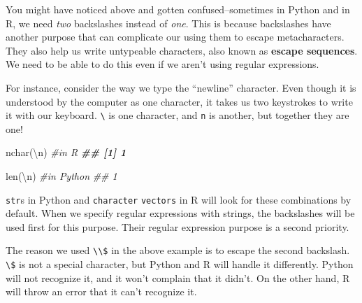 \documentclass[
  12pt,
  krantz2]{krantz}
\makeatletter
\newenvironment{Shaded}{\begin{snugshade}}{\end{snugshade}}
\newcommand{\BuiltInTok}[1]{#1}
\newcommand{\CharTok}[1]{\textcolor[rgb]{0.5,0.5,0.5}{#1}}
\newcommand{\CommentTok}[1]{\textcolor[rgb]{0.37,0.37,0.37}{\textit{#1}}}
\newcommand{\DocumentationTok}[1]{\textcolor[rgb]{0.37,0.37,0.37}{\textbf{\textit{#1}}}}
\newcommand{\FunctionTok}[1]{\textcolor[rgb]{0,0,0}{#1}}
\newcommand{\NormalTok}[1]{#1}
\newcommand{\SpecialCharTok}[1]{\textcolor[rgb]{0,0,0}{#1}}
\newcommand{\StringTok}[1]{\textcolor[rgb]{0.5,0.5,0.5}{#1}}
\newenvironment{kframe}{%
\medskip{}
\setlength{\fboxsep}{.8em}
 \def\at@end@of@kframe{}%
 \ifinner\ifhmode%
  \def\at@end@of@kframe{\end{minipage}}%
  \begin{minipage}{\columnwidth}%
 \fi\fi%
 \def\FrameCommand##1{\hskip\@totalleftmargin \hskip-\fboxsep
 \colorbox{shadecolor}{##1}\hskip-\fboxsep
     \hskip-\linewidth \hskip-\@totalleftmargin \hskip\columnwidth}%
 \MakeFramed {\advance\hsize-\width
   \@totalleftmargin\z@ \linewidth\hsize
   \@setminipage}}%
 {\par\unskip\endMakeFramed%
 \at@end@of@kframe}
\renewenvironment{Shaded}{\begin{kframe}}{\end{kframe}}
\makeatother
\begin{document}
You might have noticed above and gotten confused--sometimes in Python and in R, we need \emph{two} backslashes instead of \emph{one}. This is because backslashes have another purpose that can complicate our using them to escape metacharacters. They also help us write untypeable characters, also known as \textbf{escape sequences}. We need to be able to do this even if we aren't using regular expressions.

For instance, consider the way we type the ``newline'' character. Even though it is understood by the computer as one character, it takes us two keystrokes to write it with our keyboard. \texttt{\textbackslash{}} is one character, and \texttt{n} is another, but together they are one!

\begin{Shaded}
\begin{Highlighting}[]
\FunctionTok{nchar}\NormalTok{(}\StringTok{\textquotesingle{}}\SpecialCharTok{\textbackslash{}n}\StringTok{\textquotesingle{}}\NormalTok{) }\CommentTok{\#in R}
\DocumentationTok{\#\# [1] 1}
\end{Highlighting}
\end{Shaded}

\begin{Shaded}
\begin{Highlighting}[]
\BuiltInTok{len}\NormalTok{(}\StringTok{\textquotesingle{}}\CharTok{\textbackslash{}n}\StringTok{\textquotesingle{}}\NormalTok{) }\CommentTok{\#in Python}
\CommentTok{\#\# 1}
\end{Highlighting}
\end{Shaded}

\texttt{str}s in Python and \texttt{character} \texttt{vectors} in R will look for these combinations by default. When we specify regular expressions with strings, the backslashes will be used first for this purpose. Their regular expression purpose is a second priority.

The reason we used \texttt{\textbackslash{}\textbackslash{}\$} in the above example is to escape the second backslash. \texttt{\textbackslash{}\$} is not a special character, but Python and R will handle it differently. Python will not recognize it, and it won't complain that it didn't. On the other hand, R will throw an error that it can't recognize it.

\begin{Shaded}
\end{Shaded}
\end{document}
